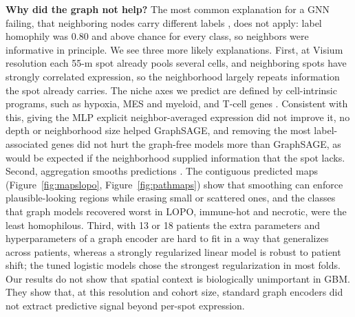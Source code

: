 \documentclass[11pt,letterpaper]{article}
\begin{document}
\textbf{Why did the graph not help?} The most common explanation for a GNN failing, that neighboring nodes carry different labels \cite{zhu2020homophily}, does not apply: label homophily was 0.80 and above chance for every class, so neighbors were informative in principle. We see three more likely explanations. First, at Visium resolution each 55-\textmu m spot already pools several cells, and neighboring spots have strongly correlated expression, so the neighborhood largely repeats information the spot already carries. The niche axes we predict are defined by cell-intrinsic programs, such as hypoxia, MES and myeloid, and T-cell genes \cite{neftel2019,greenwald2024}. Consistent with this, giving the MLP explicit neighbor-averaged expression did not improve it, no depth or neighborhood size helped GraphSAGE, and removing the most label-associated genes did not hurt the graph-free models more than GraphSAGE, as would be expected if the neighborhood supplied information that the spot lacks. Second, aggregation smooths predictions \cite{li2018deeper}. The contiguous predicted maps (Figure~\ref{fig:mapslopo}, Figure~\ref{fig:pathmaps}) show that smoothing can enforce plausible-looking regions while erasing small or scattered ones, and the classes that graph models recovered worst in LOPO, immune-hot and necrotic, were the least homophilous. Third, with 13 or 18 patients the extra parameters and hyperparameters of a graph encoder are hard to fit in a way that generalizes across patients, whereas a strongly regularized linear model is robust to patient shift; the tuned logistic models chose the strongest regularization in most folds. Our results do not show that spatial context is biologically unimportant in GBM. They show that, at this resolution and cohort size, standard graph encoders did not extract predictive signal beyond per-spot expression.
\end{document}
